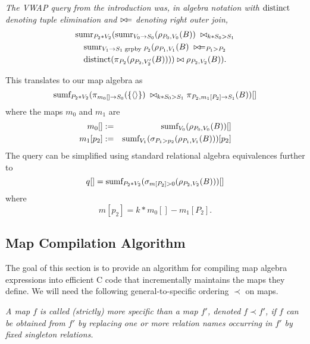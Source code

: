 \begin{example}\em
The VWAP query from the introduction was, in algebra notation with $\mbox{distinct}$
denoting
tuple elimination and $\bowtie\!=$ denoting right outer join,
\begin{multline*}
\mbox{sumr}_{P_2 * V_2}(\mbox{sumr}_{V_0 \rightarrow S_0}(\rho_{P_0, V_0}(B))
\; \bowtie_{k * S_0 > S_1} \\
\mbox{sumr}_{V_1 \rightarrow S_1 \;\mathrm{grpby}\; P_2}(
\rho_{P_1, V_1}(B) \; \bowtie\!=_{P_1 > P_2} \\
\mbox{distinct}(\pi_{P_2}(\rho_{P_2, V_2'}(B)))) \bowtie \rho_{P_2, V_2}(B)).
\end{multline*}

%
This translates to our map algebra as
\[
\mbox{sumf}_{P_2 * V_2}(
\pi_{m_0[]  \rightarrow S_0}(\{{\langle\rangle}\})
\; \bowtie_{k * S_0 > S_1}
\pi_{P_2, m_1[P_2] \rightarrow S_1}(B))[]
\]
%
where the maps $m_0$ and $m_1$ are
\begin{eqnarray*}
m_0[] &:=&
\mbox{sumf}_{V_0}(\rho_{P_0, V_0}(B))[]
\\
m_1[p_2] &:=&
\mbox{sumf}_{V_1}(\sigma_{P_1 > p_2}(\rho_{P_1, V_1}(B)))[p_2]
\end{eqnarray*}
The query can be simplified using standard relational algebra equivalences
further to
\begin{equation}
q[] = \mbox{sumf}_{P_2 * V_2}(
\sigma_{m[P_2] > 0}(\rho_{P_2, V_2}(B)))[]
\end{equation}
where
\[
m[p_2] = k * m_0[] - m_1[P_2].
\]
\punto
\end{example}



\subsection{Map Compilation Algorithm}


The goal of this section is to provide an algorithm for compiling map algebra
expressions into efficient C code that incrementally maintains the
maps they define.
We will need the following general-to-specific ordering $\prec$ on maps.


\begin{definition}\em
A map $f$ is called (strictly) {\em more specific than}\/ a map $f'$,
denoted $f \prec f'$, if $f$ can be obtained from $f'$ by replacing
one or more relation names occurring in $f'$ by fixed singleton relations.
\end{definition}


